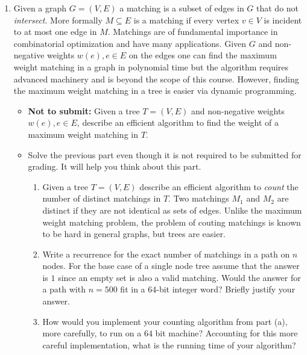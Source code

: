 \documentclass[11pt]{article}
\begin{document}


\begin{enumerate}[$3$.]
\item Given a graph $G=(V,E)$ a matching is a subset of edges in $G$
  that do not \emph{intersect}. More formally $M \subseteq E$ is a
  matching if every vertex $v \in V$ is incident to at most one edge
  in $M$. Matchings are of fundamental importance in combinatorial
  optimization and have many applications. Given $G$ and non-negative
  weights $w(e), e \in E$ on the edges one can find the maximum weight
  matching in a graph in polynomial time but the algorithm requires
  advanced machinery and is beyond the scope of this course. However,
  finding the maximum weight matching in a tree is easier via dynamic
  programming. 

  \begin{itemize}
  \item {\bf Not to submit:} Given a tree $T=(V,E)$ and non-negative
    weights $w(e), e \in E$, describe an efficient algorithm to find
    the weight of a maximum weight matching in $T$.
  \item Solve the previous part even though it is not required to be
    submitted for grading. It will help you think about this part.
    \begin{enumerate}
    \item Given a tree $T=(V,E)$ describe an efficient algorithm to
      \emph{count} the number of distinct matchings in $T$. Two matchings
      $M_1$ and $M_2$ are distinct if they are not identical as sets of edges.
      Unlike the maximum weight matching problem, the problem of couting
      matchings is known to be hard in general graphs, but trees are
      easier. 
    \item Write a recurrence for the exact number of matchings in a
      path on $n$ nodes. For the base case of a single node tree
      assume that the answer is $1$ since an empty set is also a valid
      matching. Would the answer for a path with $n=500$ fit in a
      $64$-bit integer word? Briefly justify your answer.
    \item How would you implement your counting algorithm from part
      (a), more carefully, to run on a $64$ bit machine?  Accounting
      for this more careful implementation, what is the running time of
      your algorithm? 
    \end{enumerate}
  \end{itemize}

  

\end{enumerate}
\end{document}
